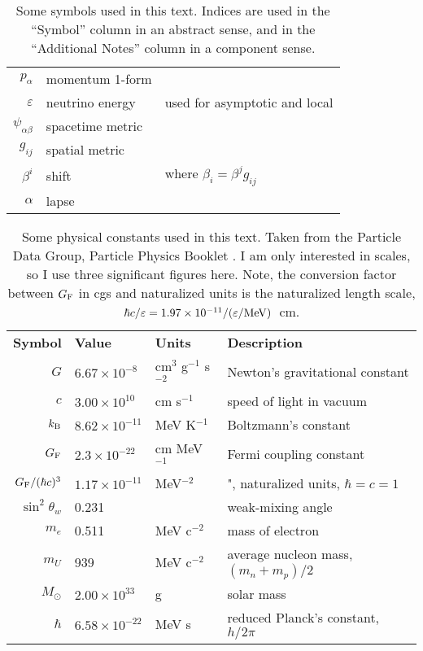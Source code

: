 \begin{table}
\begin{tabular}{rll}
    $p_\alpha$            & momentum 1-form           & \\
    $\varepsilon$         & neutrino energy           & used for asymptotic and local \\
    $\psi_{\alpha\beta}$  & spacetime metric          & \\
    $g_{ij}$              & spatial metric            & \\
    $\beta^i$             & shift                     & where $\beta_i = \beta^j g_{ij}$ \\
    $\alpha$              & lapse                     & \\
  \end{tabular}
  \caption[Symbols used in the text]{
    Some symbols used in this text.
    Indices are used in the ``Symbol'' column in an abstract sense, and in the
    ``Additional Notes'' column in a component sense.
  }
  \label{tab:conventions}
\end{table}

\begin{table}
  \centering
  \begin{tabular}{rlll}
    \textbf{Symbol} & \textbf{Value}       & \textbf{Units}           & \textbf{Description} \\
    $G$             & $6.67\times10^{-8}$  & cm$^3$ g$^{-1}$ s$^{-2}$ & Newton's gravitational constant \\
    $c$             & $3.00\times10^{10}$  & cm s$^{-1}$              & speed of light in vacuum \\
    $k_{\rm B}$     & $8.62\times10^{-11}$ & MeV K$^{-1}$             & Boltzmann's constant \\
    $G_{\rm F}$     & $2.3\times10^{-22}$  & cm MeV$^{-1}$            & Fermi coupling constant \\
    $G_{\rm F}/(\hbar c)^3$ & $1.17\times10^{-11}$ & MeV$^{-2}$       & ", naturalized units, $\hbar=c=1$ \\
    $\sin^2\theta_w$& 0.231                &                          & weak-mixing angle \\
    $m_e$           & 0.511                & MeV c$^{-2}$             & mass of electron \\
    $m_U$           & 939                  & MeV c$^{-2}$             & average nucleon mass, $(m_n+m_p)/2$ \\
    $M_\odot$       & $2.00\times10^{33}$  & g                        & solar mass \\
    $\hbar$         & $6.58\times10^{-22}$ & MeV s                    & reduced Planck's constant, $h/2\pi$ \\
  \end{tabular}
  \caption[Physical constants used in the text]{
    Some physical constants used in this text. Taken from the Particle Data
    Group, Particle Physics Booklet \citep{oliv2014-pdg}.
    I am only interested in scales, so I use three significant figures here.
    Note, the conversion factor between $G_{\rm F}$ in cgs and
    naturalized units is the naturalized length scale,
    $\hbar c/\varepsilon=1.97\times10^{-11}/(\varepsilon/{\rm MeV})$~cm.
  }
  \label{tab:constants}
\end{table}

